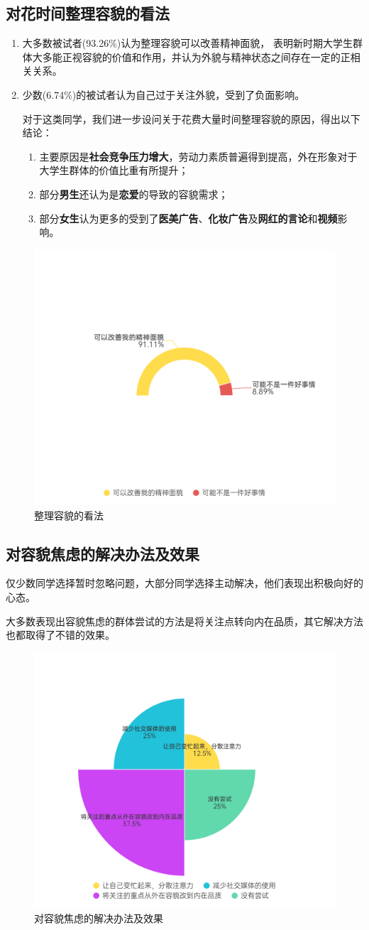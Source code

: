 \subsection{对花时间整理容貌的看法}
\begin{enumerate}[leftmargin=7em]
    \item 大多数被试者(93.26\%)认为整理容貌可以改善精神面貌，
    表明新时期大学生群体大多能正视容貌的价值和作用，并认为外貌与精神状态之间存在一定的正相关关系。

    \item 少数(6.74\%)的被试者认为自己过于关注外貌，受到了负面影响。

    对于这类同学，我们进一步设问关于花费大量时间整理容貌的原因，得出以下结论：
    \begin{enumerate}
        \item 主要原因是\textbf{社会竞争压力增大}，劳动力素质普遍得到提高，外在形象对于大学生群体的价值比重有所提升；
        \item 部分\textbf{男生}还认为是\textbf{恋爱}的导致的容貌需求；
        \item 部分\textbf{女生}认为更多的受到了\textbf{医美广告}、\textbf{化妆广告}及\textbf{网红的言论}和\textbf{视频}影响。
    \end{enumerate}
\end{enumerate}
\begin{figure}[H]
    \centering
    \includegraphics[width=.4\textwidth]{./pic/整理容貌的看法.png}
    \caption{整理容貌的看法}
\end{figure}
\subsection{对容貌焦虑的解决办法及效果}
仅少数同学选择暂时忽略问题，大部分同学选择主动解决，他们表现出积极向好的心态。

大多数表现出容貌焦虑的群体尝试的方法是将关注点转向内在品质，其它解决方法也都取得了不错的效果。
\begin{figure}[H]
    \centering
    \includegraphics[width=.5\textwidth]{./pic/解决.jpg}
    \caption{对容貌焦虑的解决办法及效果}
\end{figure}
